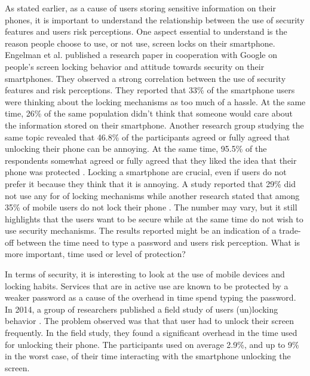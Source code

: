   As stated earlier, as a cause of users storing sensitive information on their phones, it is important to understand the relationship between the use of security features and users risk perceptions. One aspect essential to understand is the reason people choose to use, or not use, screen locks on their smartphone. Engelman et al. \cite{Egelman} published a research paper in cooperation with Google on people's screen locking behavior and attitude towards security on their smartphones. They observed a strong correlation between the use of security features and risk perceptions. They reported that 33\% of the smartphone users were thinking about the locking mechanisms as too much of a hassle. At the same time, 26\% of the same population didn't think that someone would care about the information stored on their smartphone. Another research group studying the same topic revealed that 46.8\% of the participants agreed or fully agreed that unlocking their phone can be annoying. At the same time, 95.5\% of the respondents somewhat agreed or fully agreed that they liked the idea that their phone was protected \cite{habits3}.  Locking a smartphone are crucial, even if users do not prefer it because they think that it is annoying. A study reported that 29\% did not use any for of locking mechanisms \cite{MobileUseage} while another research stated that among 35\% of mobile users do not lock their phone \cite{Bruggen}. The number may vary, but it still highlights that the users want to be secure while at the same time do not wish to use security mechanisms. The results reported might be an indication of a trade-off between the time need to type a password and users risk perception. What is more important, time used or level of protection?

  In terms of security, it is interesting to look at the use of mobile devices and locking habits. Services that are in active use are known to be protected by a weaker password as a cause of the overhead in time spend typing the password. In 2014, a group of researchers published a field study of users (un)locking behavior \cite{habits3}. The problem observed was that that user had to unlock their screen frequently. In the field study, they found a significant overhead in the time used for unlocking their phone. The participants used on average 2.9\%, and up to 9\% in the worst case, of their time interacting with the smartphone unlocking the screen.

